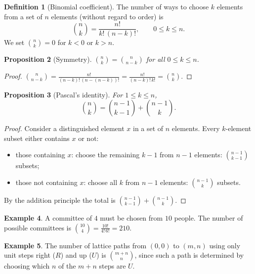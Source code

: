 \documentclass[12pt,a4paper,openany]{book}
\theoremstyle{definition}
\newtheorem{definition}{Definition}[chapter]
\newtheorem{example}[definition]{Example}
\theoremstyle{plain}
\newtheorem{proposition}[definition]{Proposition}
\theoremstyle{remark}
\begin{document}
\begin{definition}[Binomial coefficient]\label{def:binomial-coeff}
The number of ways to choose $k$ elements from a set of $n$ elements
(without regard to order) is
\[
  \binom{n}{k} = \frac{n!}{k!\,(n-k)!}, \qquad 0 \leq k \leq n.
\]
We set $\binom{n}{k} = 0$ for $k < 0$ or $k > n$.
\end{definition}

\begin{proposition}[Symmetry]\label{prop:binom-symmetry}
$\displaystyle\binom{n}{k} = \binom{n}{n-k}$ for all $0 \leq k \leq n$.
\end{proposition}

\begin{proof}
$\displaystyle\binom{n}{n-k} = \frac{n!}{(n-k)!\,(n-(n-k))!} = \frac{n!}{(n-k)!\,k!} = \binom{n}{k}$.
\end{proof}

\begin{proposition}[Pascal's identity]\label{prop:pascal-identity}
For $1 \leq k \leq n$,
\[
  \binom{n}{k} = \binom{n-1}{k-1} + \binom{n-1}{k}.
\]
\end{proposition}

\begin{proof}
Consider a distinguished element $x$ in a set of $n$ elements. Every
$k$-element subset either contains $x$ or not:
\begin{itemize}[nosep]
  \item those containing $x$: choose the remaining $k-1$ from $n-1$ elements:
        $\binom{n-1}{k-1}$ subsets;
  \item those not containing $x$: choose all $k$ from $n-1$ elements:
        $\binom{n-1}{k}$ subsets.
\end{itemize}
By the addition principle the total is $\binom{n-1}{k-1} + \binom{n-1}{k}$.
\end{proof}

\begin{example}\label{ex:committee}
A committee of $4$ must be chosen from $10$ people. The number of possible
committees is $\binom{10}{4} = \frac{10!}{4!\,6!} = 210$.
\end{example}

\begin{example}\label{ex:lattice-paths}
The number of lattice paths from $(0,0)$ to $(m,n)$ using only unit steps
right ($R$) and up ($U$) is $\binom{m+n}{n}$, since such a path is
determined by choosing which $n$ of the $m + n$ steps are $U$.
\end{example}
\end{document}
